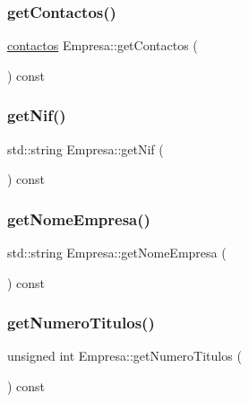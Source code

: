 \subsubsection{\texorpdfstring{get\+Contactos()}{getContactos()}}
{\footnotesize\ttfamily \mbox{\hyperlink{structcontactos}{contactos}} Empresa\+::get\+Contactos (\begin{DoxyParamCaption}{ }\end{DoxyParamCaption}) const}

\mbox{\label{class_empresa_a6ab12452496ccaea5493bd2c67824f09}} 
\subsubsection{\texorpdfstring{get\+Nif()}{getNif()}}
{\footnotesize\ttfamily std\+::string Empresa\+::get\+Nif (\begin{DoxyParamCaption}{ }\end{DoxyParamCaption}) const}

\mbox{\label{class_empresa_a99bc2de98a0c0348abb74c93e6e7159e}} 
\subsubsection{\texorpdfstring{get\+Nome\+Empresa()}{getNomeEmpresa()}}
{\footnotesize\ttfamily std\+::string Empresa\+::get\+Nome\+Empresa (\begin{DoxyParamCaption}{ }\end{DoxyParamCaption}) const}

\mbox{\label{class_empresa_a49b2b94a54bbc341822f64fc194f98fd}} 
\subsubsection{\texorpdfstring{get\+Numero\+Titulos()}{getNumeroTitulos()}}
{\footnotesize\ttfamily unsigned int Empresa\+::get\+Numero\+Titulos (\begin{DoxyParamCaption}{ }\end{DoxyParamCaption}) const}

